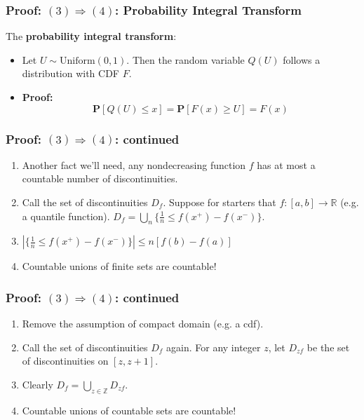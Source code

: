 \documentclass[handout]{beamer}
\newcommand{\BP}{\mathbf{P}}
\begin{document}
        




\frame
{
  \frametitle{Proof: $(3) \Rightarrow (4)$:  Probability Integral Transform} 

The \textbf{probability integral transform}:

\begin{itemize}

\item<1->[-] Let $U \sim \text{Uniform}(0,1)$. Then the random variable $Q(U)$ follows a distribution with CDF $F$. 


\item<2->[-] \textbf{Proof:} $$\BP[Q(U)\leq x] =\BP [F(x) \geq U]=F(x)$$

\end{itemize}


}





\frame
{
  \frametitle{Proof: $(3) \Rightarrow (4)$: continued} 


\begin{enumerate}
                   
\item Another fact we'll need, any nondecreasing function $f$ has at most a countable number of discontinuities. 

\item Call the set of discontinuities $D_f$. Suppose for starters that $f : [a,b] \to \mathbb{R}$ (e.g. a quantile function).  $D_f = \bigcup_{n} \{  \frac{1}{n} \le  f(x^+) - f(x^-) \}$.

\item $|\{  \frac{1}{n} \le  f(x^+) - f(x^-) \}| \le n [f(b) - f(a)]$

\item Countable unions of finite sets are countable!


\end{enumerate}
}


\frame
{
  \frametitle{Proof: $(3) \Rightarrow (4)$: continued} 


\begin{enumerate}
                   
\item Remove the assumption of compact domain (e.g. a cdf).

\item Call the set of discontinuities $D_f$ again.  For any integer $z$, let $D_{zf}$ be the set of discontinuities on $[z,z+1]$. 

\item Clearly $D_f = \bigcup_{z \in \mathbb{Z}} D_{zf}$.

\item Countable unions of countable sets are countable!

\end{enumerate}
}
\end{document}
